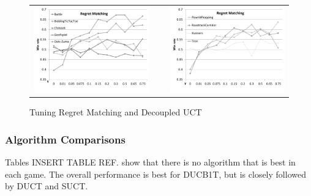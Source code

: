 \documentclass[conference]{IEEEtran}
\begin{document}
\begin{figure}[t!]
\begin{tabular}{ccc}
\includegraphics[scale=0.33]{figures/regretmatching1} & ~ & \includegraphics[scale=0.33]{figures/regretmatching2}\\
\end{tabular}
\caption{Tuning Regret Matching and Decoupled UCT}
\label{fig:tuning1}
\end{figure}


\subsubsection{Algorithm Comparisons}
Tables INSERT TABLE REF. show that there is no algorithm that is best in each game. The overall performance is best for DUCB1T, but is closely followed by DUCT and SUCT.
\end{document}
